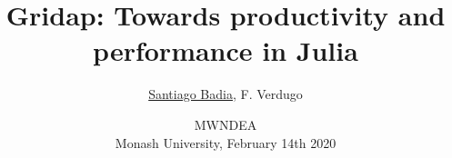 \documentclass[12pt,mathserif,xcolor={dvipsnames}]{beamer}      %
\title[]{Gridap: Towards productivity and performance in Julia}
\author[S. Badia]{{\underline{Santiago Badia}, F. Verdugo}}
\date{\small MWNDEA \\ Monash University, February 14th 2020}
\begin{document}
\addtocounter{framenumber}{-1}
\frame[plain]{
  \titlepage
}

\makeatletter
\newcommand{\opnorm}{\@ifstar\@opnorms\@opnorm}
\newcommand{\@opnorms}[1]{%
    \left|\mkern-1.5mu\left|\mkern-1.5mu\left|
       #1
         \right|\mkern-1.5mu\right|\mkern-1.5mu\right|
       }
       \newcommand{\@opnorm}[2][]{%
           \mathopen{#1|\mkern-1.5mu#1|\mkern-1.5mu#1|}
             #2
               \mathclose{#1|\mkern-1.5mu#1|\mkern-1.5mu#1|}
             }
             \makeatother



\end{document}
